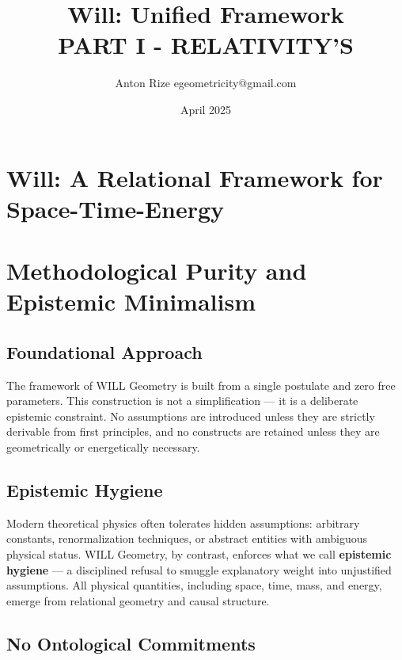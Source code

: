 \documentclass{article}
\title{Will: Unified Framework\\
PART I - RELATIVITY'S}
\author{Anton Rize egeometricity@gmail.com}
\date{April 2025}
\begin{document}
\theoremstyle{definition}
\newtheorem{definition}{Definition}
\newtheorem{theorem}{Theorem}
\newtheorem{lemma}{Lemma}
\newtheorem{corollary}{Corollary}

\maketitle

\newpage

\tableofcontents

\section{Will: A Relational Framework for Space-Time-Energy}


\section{Methodological Purity and Epistemic Minimalism}

\subsection{Foundational Approach}

The framework of WILL Geometry is built from a single postulate and zero free parameters. This construction is not a simplification — it is a deliberate epistemic constraint. No assumptions are introduced unless they are strictly derivable from first principles, and no constructs are retained unless they are geometrically or energetically necessary.

\subsection{Epistemic Hygiene}

Modern theoretical physics often tolerates hidden assumptions: arbitrary constants, renormalization techniques, or abstract entities with ambiguous physical status. WILL Geometry, by contrast, enforces what we call \textbf{epistemic hygiene} — a disciplined refusal to smuggle explanatory weight into unjustified assumptions. All physical quantities, including space, time, mass, and energy, emerge from relational geometry and causal structure.

\subsection{No Ontological Commitments}
\end{document}
